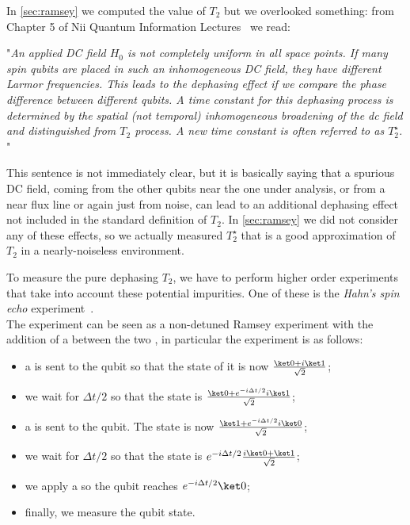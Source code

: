 
In \cref{sec:ramsey} we computed the value of $T_2$ but we overlooked something: from Chapter 5 of Nii Quantum Information Lectures~\cite{nii_quantum_lectures} we read:
\begin{paragraph}
"\textit{An applied DC field $H_0$ is not completely uniform in all space points. If many spin qubits are placed in such an inhomogeneous DC field, they have different Larmor frequencies. This leads to the dephasing effect if we compare the phase difference between different qubits. A time constant for this dephasing process is determined by the spatial (not temporal) inhomogeneous broadening of the dc field and distinguished from $T_2$ process. A new time constant is often referred to as $T_2^\star$.} "
\end{paragraph}

This sentence is not immediately clear, but it is basically saying that a spurious DC field, coming from the other qubits near the one under analysis, or from a near flux line or again just from noise, can lead to an additional dephasing effect not included in the standard definition of $T_2$.
In \cref{sec:ramsey} we did not consider any of these effects, so we actually measured $T_2^\star$ that is a good approximation of $T_2$ in a nearly-noiseless environment.

To measure the pure dephasing $T_2$, we have to perform higher order experiments that take into account these potential impurities. 
One of these is the \textit{Hahn’s spin echo} experiment~\cite{Hahn1950}.\\
The experiment can be seen as a non-detuned Ramsey experiment with the addition of a \pipulse between the two \pihpulse, in particular the experiment is as follows:
\begin{itemize}
    \item a \pihpulse is sent to the qubit so that the state of it is now $\frac{\ket 0 + i\ket 1}{\sqrt{2}}$;
    \item we wait for $\Delta t / 2$ so that the state is $\frac{\ket 0 + e^{-i\Delta t /2}i\ket 1}{\sqrt{2}}$;
    \item a \pipulse is sent to the qubit. The state is now $\frac{\ket 1 + e^{-i\Delta t /2}i\ket 0}{\sqrt{2}}$;
    \item we wait for $\Delta t / 2$ so that the state is $e^{-i\Delta t /2}\frac{i\ket 0 + \ket 1}{\sqrt{2}}$;
    \item we apply a \pihpulse so the qubit reaches $e^{-i\Delta t /2} \ket 0$;
    \item finally, we measure the qubit state.
\end{itemize}

